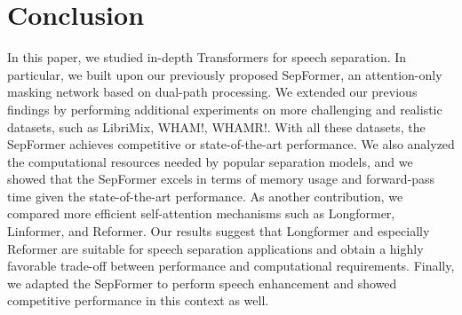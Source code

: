 \documentclass[lettersize,journal]{IEEEtran}
\begin{document}
\begin{table}[t!]
 \small
 \caption{Speech enhancement results on the Voicebank-Demand dataset (Denoising)}
 \vspace{0.1cm}
 \label{table:enhancement-voicebank}
 \centering
\end{table}

\section{Conclusion}
In this paper, we studied in-depth Transformers for speech separation.  In particular, we built upon our previously proposed  SepFormer, an attention-only masking network based on dual-path processing. We extended our previous findings by performing additional experiments on more challenging and realistic datasets, such as LibriMix, WHAM!, WHAMR!. With all these datasets, the SepFormer achieves competitive or state-of-the-art performance.
We also analyzed the computational resources needed by popular separation models, and we showed that the SepFormer excels in terms of 
memory usage and forward-pass time given the state-of-the-art performance.
 As another contribution, we compared more efficient self-attention mechanisms such as Longformer, Linformer, and Reformer. 
Our results suggest that Longformer and especially Reformer are suitable for speech separation applications and obtain a highly favorable trade-off between performance and computational requirements.  Finally, we adapted the SepFormer to perform speech enhancement and showed competitive performance in this context as well.
\end{document}
